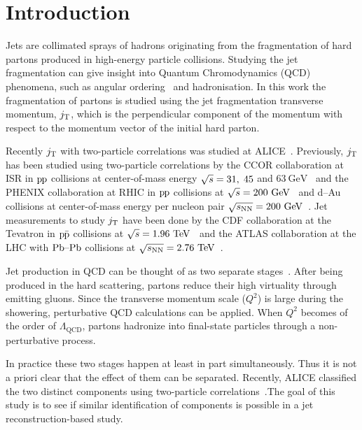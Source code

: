 \linenumbers

\section{Introduction}
\label{sec:introduction}
Jets are collimated sprays of hadrons originating from the fragmentation of hard partons produced in high-energy particle collisions. Studying the jet fragmentation can give insight into Quantum Chromodynamics (QCD)~\cite{qcd} phenomena, such as angular ordering~\cite{basicsofpqcd} and hadronisation. In this work the fragmentation of partons is studied using the jet fragmentation transverse momentum, $\jt{}$, which is the perpendicular component of the momentum with respect to the momentum vector of the initial hard parton.

Recently $\jt{}$ with two-particle correlations was studied at ALICE~\cite{ALICEjt}. Previously, $\jt{}$ has been studied using two-particle correlations by the CCOR collaboration at ISR in $\pp$ collisions at center-of-mass energy $\sqrtS = 31,\;45$ and $63~\mathrm{GeV}$~\cite{firstjtmeasurement} and the PHENIX collaboration at RHIC in $\pp$ collisions at $\sqrtSE[GeV]{200}$~\cite{PHENIXjets} and d--Au collisions at center-of-mass energy per nucleon pair $\sqrtSnnE[GeV]{200}$~\cite{phenixJtPAu}. Jet measurements to study $\jt{}$ have been done by the CDF collaboration at the Tevatron in $\ppbar$ collisions at $\sqrtSE{1.96}$~\cite{cdfpaper} and the ATLAS collaboration at the LHC with $\PbPb$ collisions at $\sqrtSnnE{2.76}$~\cite{atlaksenJetit}.

Jet production in QCD can be thought of as two separate stages~\cite{eventGenerators}. After being produced in the hard scattering, partons reduce their high virtuality through emitting gluons. Since the transverse momentum scale ($Q^{2}$) is large during the showering, perturbative QCD calculations can be applied. When $Q^{2}$ becomes of the order of $\Lambda_{\mathrm{QCD}}$, partons hadronize into final-state particles through a non-perturbative process. 

In practice these two stages happen at least in part simultaneously. %
Thus it is not a priori clear that the effect of them can be separated. Recently, ALICE classified the two distinct components using two-particle correlations~\cite{ALICEjt}.The goal of this study is to see if similar identification of components is possible in a jet reconstruction-based study. 

